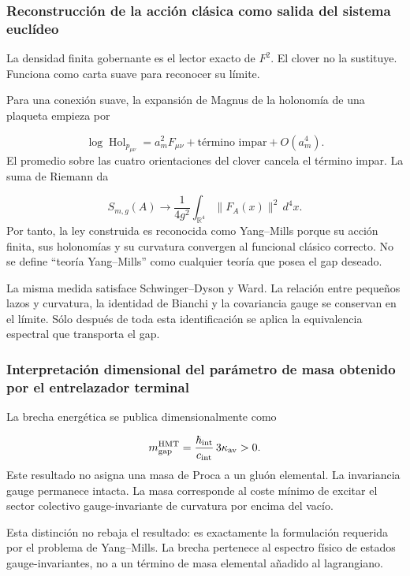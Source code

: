 \subsubsection{Reconstrucción de la acción clásica como salida del sistema euclídeo}
La densidad finita gobernante es el lector exacto de \(F^2\). El clover no la sustituye. Funciona como carta suave para reconocer su límite.\par
Para una conexión suave, la expansión de Magnus de la holonomía de una plaqueta empieza por\par
\[
\log\operatorname{Hol}_{p_{\mu\nu}}
=
a_m^2F_{\mu\nu}
+\text{término impar}
+O(a_m^4).
\]
El promedio sobre las cuatro orientaciones del clover cancela el término impar. La suma de Riemann da\par
\[
S_{m,g}(A)
\longrightarrow
\frac1{4g^2}
\int_{\mathbb R^4}\|F_A(x)\|^2\,d^4x.
\]
Por tanto, la ley construida es reconocida como Yang–Mills porque su acción finita, sus holonomías y su curvatura convergen al funcional clásico correcto. No se define “teoría Yang–Mills” como cualquier teoría que posea el gap deseado.\par
La misma medida satisface Schwinger–Dyson y Ward. La relación entre pequeños lazos y curvatura, la identidad de Bianchi y la covariancia gauge se conservan en el límite. Sólo después de toda esta identificación se aplica la equivalencia espectral que transporta el gap.\par
{}
\subsubsection{Interpretación dimensional del parámetro de masa obtenido por el entrelazador terminal}
La brecha energética se publica dimensionalmente como\par
\[
m_{\rm gap}^{\rm HMT}
=
\frac{\hbar_{\rm int}}{c_{\rm int}}
\,3\kappa_{\rm av}>0.
\]
Este resultado no asigna una masa de Proca a un gluón elemental. La invariancia gauge permanece intacta. La masa corresponde al coste mínimo de excitar el sector colectivo gauge-invariante de curvatura por encima del vacío.\par
Esta distinción no rebaja el resultado: es exactamente la formulación requerida por el problema de Yang–Mills. La brecha pertenece al espectro físico de estados gauge-invariantes, no a un término de masa elemental añadido al lagrangiano.\par
{}
